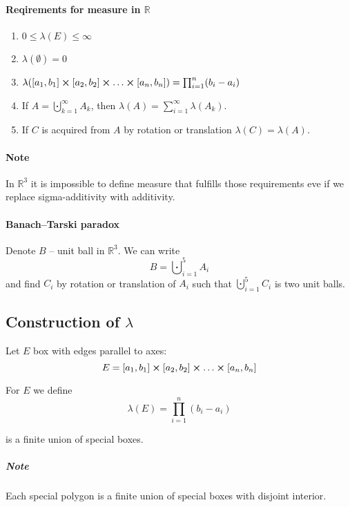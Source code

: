\paragraph{Reqirements for measure in $\mathbb{R}$}

\begin{enumerate}
	\item $0\leq \lambda(E) \leq \infty$
	\item $\lambda(\emptyset) = 0$
	\item $\lambda(\qty[a_1,b_1]\cross\qty[a_2,b_2]\cross\dots\cross \qty[a_n,b_n]) = \prod_{i=1}^n (b_i-a_i)$
	\item If $A = \bigcupdot_{k=1}^\infty A_k$, then $\lambda(A) = \sum_{i=1}^\infty \lambda(A_k)$.
	\item If $C$ is acquired from $A$ by rotation or translation $\lambda(C) = \lambda(A)$.
\end{enumerate}
\paragraph{Note} In $\mathbb{R}^3$ it is impossible to define measure that fulfills those requirements eve if we replace sigma-additivity with additivity.
\paragraph{Banach–Tarski paradox} Denote $B$ -- unit ball in $\mathbb{R}^3$. We can write 
$$B = \bigcupdot_{i=1}^5 A_i$$
and find $C_i$ by rotation or translation of $A_i$ such that $\bigcupdot_{i=1}^5 C_i$ is two unit balls.

\begin{center}
	
\end{center}
\subsection{Construction of $\lambda$}
\begin{definition}
	Let $E$ box with edges parallel to axes:
	$$E = \qty[a_1,b_1]\cross\qty[a_2,b_2]\cross\dots\cross \qty[a_n,b_n]$$
	
	For $E$ we define 
	$$\lambda(E) = \prod_{i=1}^n (b_i-a_i)$$
\end{definition}
 
 \begin{definition} is a finite union of special boxes. 
 \end{definition}
 \subparagraph{Note} Each special polygon is a finite union of special boxes with disjoint interior.
 
